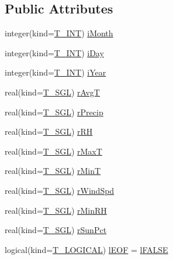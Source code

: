 \subsection*{Public Attributes}
\begin{DoxyCompactItemize}
\item 
integer(kind=\hyperlink{namespacetypes_a4e4d040a4425196c4d43be63e7e6103a}{T\_\-INT}) \hyperlink{typetypes_1_1_t___t_i_m_e___s_e_r_i_e_s___f_i_l_e_a042cf93b0616ab98ea2670e209a25415}{iMonth}
\item 
integer(kind=\hyperlink{namespacetypes_a4e4d040a4425196c4d43be63e7e6103a}{T\_\-INT}) \hyperlink{typetypes_1_1_t___t_i_m_e___s_e_r_i_e_s___f_i_l_e_a95040eec42351a0517d8233cd7b4c679}{iDay}
\item 
integer(kind=\hyperlink{namespacetypes_a4e4d040a4425196c4d43be63e7e6103a}{T\_\-INT}) \hyperlink{typetypes_1_1_t___t_i_m_e___s_e_r_i_e_s___f_i_l_e_aaae8992c73e9764ce1e54c77501edb3b}{iYear}
\item 
real(kind=\hyperlink{namespacetypes_af3012489af4c138f271f1bce244b7e51}{T\_\-SGL}) \hyperlink{typetypes_1_1_t___t_i_m_e___s_e_r_i_e_s___f_i_l_e_a386078faad825436d231a04add5769c3}{rAvgT}
\item 
real(kind=\hyperlink{namespacetypes_af3012489af4c138f271f1bce244b7e51}{T\_\-SGL}) \hyperlink{typetypes_1_1_t___t_i_m_e___s_e_r_i_e_s___f_i_l_e_a6682746981b5aaff7a9b66f18002786f}{rPrecip}
\item 
real(kind=\hyperlink{namespacetypes_af3012489af4c138f271f1bce244b7e51}{T\_\-SGL}) \hyperlink{typetypes_1_1_t___t_i_m_e___s_e_r_i_e_s___f_i_l_e_ae25df568b11c1ebaaf9f8318d643fb92}{rRH}
\item 
real(kind=\hyperlink{namespacetypes_af3012489af4c138f271f1bce244b7e51}{T\_\-SGL}) \hyperlink{typetypes_1_1_t___t_i_m_e___s_e_r_i_e_s___f_i_l_e_af3573ccce95c5fd28c61add243b8dea7}{rMaxT}
\item 
real(kind=\hyperlink{namespacetypes_af3012489af4c138f271f1bce244b7e51}{T\_\-SGL}) \hyperlink{typetypes_1_1_t___t_i_m_e___s_e_r_i_e_s___f_i_l_e_a4703173937768707a74f5d7e84937757}{rMinT}
\item 
real(kind=\hyperlink{namespacetypes_af3012489af4c138f271f1bce244b7e51}{T\_\-SGL}) \hyperlink{typetypes_1_1_t___t_i_m_e___s_e_r_i_e_s___f_i_l_e_ac2dbf2ef9df9d1d64eb80e14fa598f93}{rWindSpd}
\item 
real(kind=\hyperlink{namespacetypes_af3012489af4c138f271f1bce244b7e51}{T\_\-SGL}) \hyperlink{typetypes_1_1_t___t_i_m_e___s_e_r_i_e_s___f_i_l_e_a0091cf1767332353442f89528c6b47ac}{rMinRH}
\item 
real(kind=\hyperlink{namespacetypes_af3012489af4c138f271f1bce244b7e51}{T\_\-SGL}) \hyperlink{typetypes_1_1_t___t_i_m_e___s_e_r_i_e_s___f_i_l_e_a3eeae8cc5cad67ad5dc017669075ee8a}{rSunPct}
\item 
logical(kind=\hyperlink{namespacetypes_adfa8f4f6096bb7bdbb93f36b911dcaad}{T\_\-LOGICAL}) \hyperlink{typetypes_1_1_t___t_i_m_e___s_e_r_i_e_s___f_i_l_e_ad0606fdb5ca56ba355b0c1cf330ebc01}{lEOF} = \hyperlink{namespacetypes_ad09a27b431e0fad201524039e6943e5b}{lFALSE}
\end{DoxyCompactItemize}


